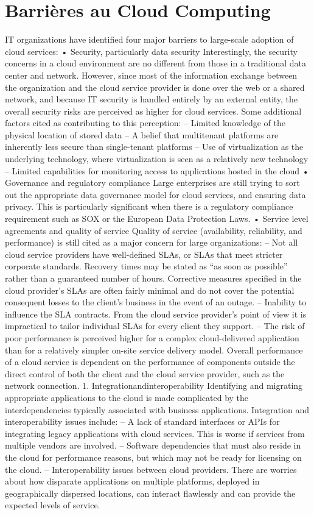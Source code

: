 \section{Barrières au Cloud Computing}

IT organizations have identified four major barriers to large-scale adoption of cloud services:
•  Security, particularly data security
Interestingly, the security concerns in a cloud environment are no different from those in a traditional data center and network. However, since most of the information exchange between the organization and the cloud service provider is done over the web or a shared network, and because IT security is handled entirely by an external entity, the overall security risks are perceived as higher for cloud services.
Some additional factors cited as contributing to this perception:
– Limited knowledge of the physical location of stored data
– A belief that multitenant platforms are inherently less secure than single-tenant platforms
– Use of virtualization as the underlying technology, where virtualization is seen as a relatively new technology
– Limited capabilities for monitoring access to applications hosted in the cloud
•  Governance and regulatory compliance
Large enterprises are still trying to sort out the appropriate data governance model for cloud services, and ensuring data privacy. This is particularly significant when there is a regulatory compliance requirement such as SOX or the European Data Protection Laws.
•  Service level agreements and quality of service
Quality of service (availability, reliability, and performance) is still cited as a
major concern for large organizations:
– Not all cloud service providers have well-defined SLAs, or SLAs that meet stricter corporate standards. Recovery times may be stated as “as soon as possible” rather than a guaranteed number of hours. Corrective measures specified in the cloud provider's SLAs are often fairly minimal and do not cover the potential consequent losses to the client's business in the event of an outage.
– Inability to influence the SLA contracts. From the cloud service provider's point of view it is impractical to tailor individual SLAs for every client they support.
– The risk of poor performance is perceived higher for a complex cloud-delivered application than for a relatively simpler on-site service delivery model. Overall performance of a cloud service is dependent on the performance of components outside the direct control of both the client and the cloud service provider, such as the network connection.
1. Integrationandinteroperability
Identifying and migrating appropriate applications to the cloud is made complicated by the interdependencies typically associated with business applications. Integration and interoperability issues include:
– A lack of standard interfaces or APIs for integrating legacy applications with cloud services. This is worse if services from multiple vendors are involved.
– Software dependencies that must also reside in the cloud for performance reasons, but which may not be ready for licensing on the cloud.
– Interoperability issues between cloud providers. There are worries about how disparate applications on multiple platforms, deployed in geographically dispersed locations, can interact flawlessly and can provide the expected levels of service.